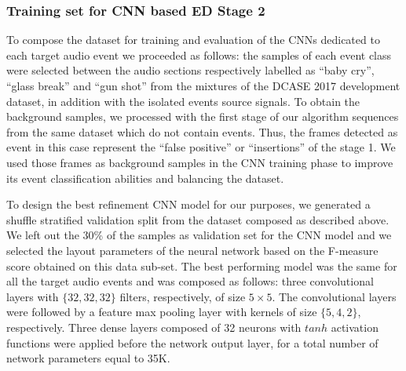 \subsubsection{Training set for CNN based ED Stage 2 }
To compose the dataset for training and evaluation of the CNNs dedicated to each target audio event we proceeded as follows: the samples of each event class were selected between the audio sections respectively labelled as ``baby cry'', ``glass break'' and ``gun shot'' from the mixtures of the DCASE 2017 development dataset, in addition with the isolated events source signals. To obtain the background samples, we processed with the first stage of our algorithm sequences from the same dataset which do not contain events. 
Thus, the frames detected as event in this case represent the ``false positive'' or ``insertions'' of the stage 1. 
We used those frames as background samples in the CNN training phase to improve its event classification abilities and balancing the dataset. 


To design the best refinement CNN model for our purposes, we generated a shuffle stratified validation split from the dataset composed as described above. We left out the 30\% of the samples as validation set for the CNN model and we selected the layout parameters of the neural network based on the F-measure score obtained on this data sub-set. 
The best performing model was the same for all the target audio events and was composed as follows: three convolutional layers with $\{32,32,32\}$ filters, respectively, of size $5\times5$. The convolutional layers were followed by a feature max pooling layer with kernels of size $\{5,4,2\}$, respectively. Three dense layers composed of 32 neurons with $tanh$ activation functions were applied before the network output layer, for a total number of network parameters equal to 35K. 



